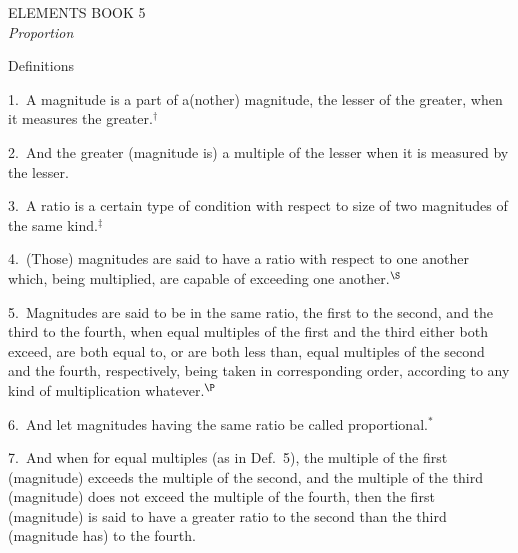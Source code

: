 \pagestyle{plain}
\begin{center}
{\Huge ELEMENTS BOOK 5}\\
\spa\spa\spa
{\huge\it Proportion}
\end{center}\newpage

\pagestyle{fancy}
\cfoot{\gr{\thepage}}

\begin{center}
{\large Definitions}
\end{center}

1.~A magnitude is a part of a(nother) magnitude, the lesser of the greater, when
it measures the greater.$^\dag$

2.~And the greater (magnitude is) a multiple of the lesser when it is measured by
the lesser.

3.~A ratio is a certain type of condition  with respect to size of two magnitudes of the same kind.$^\ddag$

4.~(Those) magnitudes are said to have a ratio with respect to one another which,
being multiplied, are capable of exceeding one another.$^\S$

5.~Magnitudes are said to be in the same ratio, the first to the second, and
the third to the fourth, when  equal multiples of the first and the third 
either both exceed, are both equal to, or are both less than, 
equal multiples of the second and the fourth, respectively,  being taken in corresponding order, according to any kind of multiplication whatever.$^\P$

6.~And let magnitudes having the same ratio be called proportional.$^\ast$

7.~And when for equal multiples (as in Def.~5), the multiple of the first (magnitude) exceeds 
the multiple of the second, and the multiple of the third (magnitude) does not
exceed the multiple of the fourth, then the first (magnitude) is said to have a greater ratio
to the second than the third (magnitude has) to the fourth.

